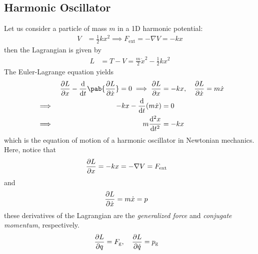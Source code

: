 \subsection{Harmonic Oscillator}
\label{sec:lagrange-harmonic-oscillator}
Let us consider a particle of mass $m$ in a 1D harmonic potential:
\begin{align}
  V & = \frac{1}{2} k x^2 \implies F_{\text{ext}} = - \nabla V = -k x
\end{align}
then the Lagrangian is given by
\begin{align}
  L & = T - V = \frac{m}{2} \dot{x}^2 - \frac{1}{2} k x^2
\end{align}
The Euler-Lagrange equation yields
\begin{alignat}{2}
   &          & \pdv{L}{x} - \odv{}{t} \pab{\pdv{L}{\dot{x}}} = 0 \implies \pdv{L}{x} & = -k x, \quad \pdv{L}{\dot{x}} = m \dot{x} \\
   & \implies & \quad -k x - \odv{}{t} (m \dot{x})                                    & = 0                                        \\
   & \implies & \quad m \odv[2]{x}{t}                                                 & = -k x
\end{alignat}
which is the equation of motion of a harmonic oscillator in Newtonian mechanics.
Here, notice that
\begin{align}
  \pdv{L}{x} & = -k x = - \nabla V = F_{\text{ext}}
\end{align}
and
\begin{align}
  \pdv{L}{\dot{x}} & = m \dot{x} = p
\end{align}
these derivatives of the Lagrangian are the \emph{generalized force} and \emph{conjugate momentum}, respectively.
\begin{align}
  \pdv{L}{q} & = F_{\text{g}}, \quad \pdv{L}{\dot{q}} = p_{\text{g}}
\end{align}
